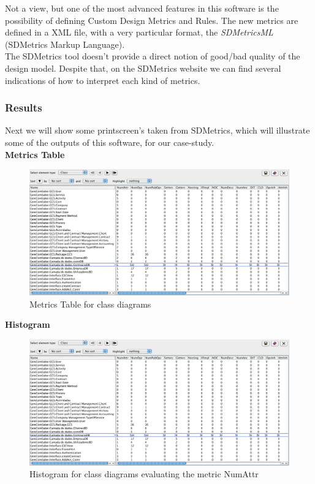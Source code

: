Not a view, but one of the most advanced features in this software is the possibility of defining Custom Design Metrics and Rules. The new metrics are defined in a XML file, with a very particular format, the \textit{SDMetricsML} (SDMetrics Markup Language). \\
The SDMetrics tool doesn't provide a direct notion of good/bad quality of the design model. Despite that, on the SDMetrics website we can find several indications of how to interpret each kind of metrics. 
 
\subsubsection{Results}

Next we will show some printscreen's taken from SDMetrics, which will illustrate some of the outputs of this software, for our case-study.\\

\textbf{Metrics Table}
\begin{figure}[H]
\begin{center}
\includegraphics[width=1\textwidth]{images/table.png}
\caption{Metrics Table for class diagrams}\label{img:table}
\end{center}
\end{figure} 

\textbf{Histogram}
\begin{figure}[H]
\begin{center}
\includegraphics[width=1\textwidth]{images/table.png}
\caption{Histogram for class diagrams evaluating the metric NumAttr}\label{img:histogram}
\end{center}
\end{figure} 

